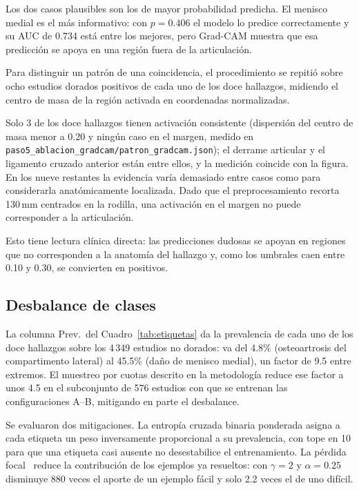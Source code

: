 \documentclass{article}
\begin{document}
Los dos casos plausibles son los de mayor probabilidad predicha. El menisco
medial es el más informativo: con $p = 0.406$ el modelo lo predice correctamente
y su AUC de 0.734 está entre los mejores, pero Grad-CAM muestra que esa predicción
se apoya en una región fuera de la articulación.

Para distinguir un patrón de una coincidencia, el procedimiento se repitió sobre
ocho estudios dorados positivos de cada uno de los doce hallazgos, midiendo el
centro de masa de la región activada en coordenadas normalizadas.

Solo 3 de los doce hallazgos tienen activación consistente
(dispersión del centro de masa menor a 0.20 y ningún caso en el margen,
medido en \texttt{paso5\_ablacion\_gradcam/patron\_gradcam.json}); el derrame
articular y el ligamento cruzado anterior están entre ellos, y la medición
coincide con la figura. En los nueve restantes la evidencia varía demasiado entre
casos como para considerarla anatómicamente localizada. Dado que el
preprocesamiento recorta 130\,mm centrados en la rodilla, una activación en el
margen no puede corresponder a la articulación.

Esto tiene lectura clínica directa: las predicciones dudosas se apoyan en
regiones que no corresponden a la anatomía del hallazgo y, como los umbrales
caen entre 0.10 y 0.30, se convierten en positivos.

\subsection{Desbalance de clases}

La columna Prev.\ del Cuadro~\ref{tab:etiquetas} da la prevalencia de cada uno de
los doce hallazgos sobre los 4\,349 estudios no dorados: va del 4.8\%
(osteoartrosis del compartimento lateral) al 45.5\% (daño de menisco medial), un
factor de 9.5 entre extremos. El muestreo por cuotas descrito en la metodología
reduce ese factor a unos 4.5 en el subconjunto de 576 estudios con que se
entrenan las configuraciones A--B, mitigando en parte el desbalance.

Se evaluaron dos mitigaciones. La entropía cruzada binaria ponderada asigna a
cada etiqueta un peso inversamente proporcional a su prevalencia, con tope en 10
para que una etiqueta casi ausente no desestabilice el entrenamiento. La pérdida
focal~\citep{lin2017focal} reduce la contribución de los ejemplos ya resueltos:
con $\gamma=2$ y $\alpha=0.25$ disminuye 880 veces el aporte de un ejemplo fácil
y solo 2.2 veces el de uno difícil.
\end{document}
